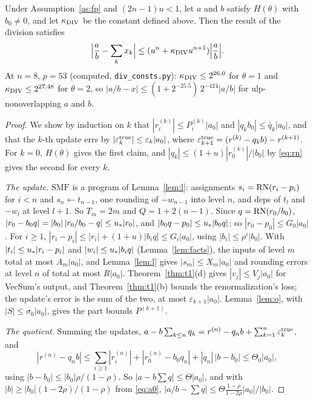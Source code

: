\begin{theorem}\label{thm:t6}
Under Assumption~\ref{as:fp} and $(2n-1)u < 1$, let $a$ and $b$ satisfy $H(\theta)$
with $b_0 \ne 0$, and let $\kappa_{\rm DIV}$ be the constant defined above. Then the result of the division satisfies
\[
\Bigl|\frac ab - \sum_k x_k\Bigr| \le (u^n + \kappa_{\rm DIV} u^{n+1})\Bigl|\frac ab\Bigr|.
\]
At $n = 8$, $p = 53$ (computed, \texttt{div\_consts.py}): $\kappa_{\rm DIV} \le 2^{26.0}$ for $\theta = 1$ and $\kappa_{\rm DIV} \le 2^{27.48}$ for $\theta = 2$, so $|a/b - x| \le (1 +
2^{-25.5})\,2^{-424}|a/b|$ for ulp-nonoverlapping $a$ and $b$.
\end{theorem}

\begin{proof}
We show by induction on $k$ that $|r^{(k)}_i| \le P^{(k)}_i|a_0|$ and $|q_kb_0| \le \bar q_k|a_0|$, and that the $k$-th
update errs by $|\varepsilon^{\rm true}_k| \le \varepsilon_k|a_0|$, where $\varepsilon^{\rm true}_{k+1} = (r^{(k)} -
q_kb) - r^{(k+1)}$. For $k = 0$, $H(\theta)$ gives the first claim, and $|q_k| \le (1+u)|r^{(k)}_0|/|b_0|$ by
\eqref{eq:rn} gives the second for every $k$.

\emph{The update.} $\mathrm{SMF}$ is a program of Lemma~\ref{lem:l}: assignments $s_i = \mathrm{RN}(r_i - p_i)$ for $i < n$
and $s_n \gets t_{n-1}$, one rounding of $-w_{n-1}$ into level $n$, and deps of $t_l$ and $-w_l$ at level $l+1$. So
$T_m = 2m$ and $Q = 1 + 2(n-1)$. Since $q = \mathrm{RN}(r_0/b_0)$, $|r_0 - b_0q| = |b_0|\,|r_0/b_0 - q| \le u_{*}|r_0|$, and
$|b_0q - p_0| \le u_{*}|b_0q|$; so $|r_0 - p_0| \le G_0|a_0|$. For $i \ge 1$, $|r_i - p_i| \le |r_i| + (1+u)|b_i q| \le
G_i|a_0|$, using $|b_i| \le \rho^i|b_0|$. With $|t_i| \le u_{*}|r_i - p_i|$ and $|w_i| \le u_{*}|b_iq|$
(Lemma~\ref{lem:facts}), the inputs of level $m$ total at most $A_m|a_0|$, and Lemma~\ref{lem:l} gives $|s_m| \le
X_m|a_0|$ and rounding errors at level $n$ of total at most $R|a_0|$. Theorem~\ref{thm:t1}(d) gives $|v_j| \le
V_j|a_0|$ for VecSum's output, and Theorem~\ref{thm:t1}(b) bounds the renormalization's loss; the update's error is the
sum of the two, at most $\varepsilon_{k+1}|a_0|$. Lemma~\ref{lem:o}, with $|S| \le \sigma_0|a_0|$, gives the part
bounds $P^{(k+1)}$.

\emph{The quotient.} Summing the updates, $a - b\sum_{k \le n}q_k = r^{(n)} - q_nb + \sum_{k=1}^n
\varepsilon^{\rm true}_k$, and
\[
|r^{(n)} - q_nb| \le \sum_{i \ge 1}|r^{(n)}_i| + |r^{(n)}_0 - b_0q_n| + |q_n|\,|b - b_0| \le \Theta_0|a_0|,
\]
using $|b - b_0| \le |b_0|\rho/(1-\rho)$. So $|a - b\sum q| \le \Theta|a_0|$, and with $|b| \ge |b_0|(1-2\rho)/(1-\rho)$
from \eqref{eq:a0}, $|a/b - \sum q| \le \Theta\frac{1-\rho}{1-2\rho}|a_0|/|b_0|$.


\end{proof}
